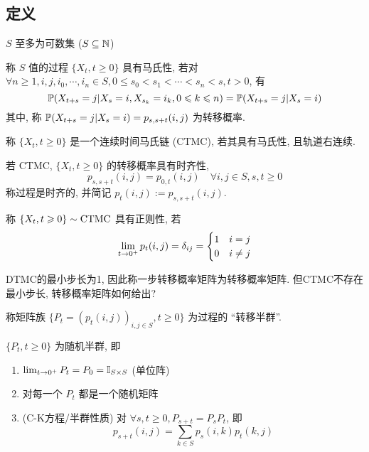 \subsection{定义}

$S$ 至多为可数集 ($S\subseteq \mathbb{N}$)

\begin{definition}[马氏性]
    称 $S$ 值的过程 $\{X_t,t\geq 0\}$ 具有马氏性, 若对 $\forall n\geq 1,i,j,i_0,\cdots,i_n\in S, 0\leq s_0<s_1<\cdots<s_n<s,t>0$, 有
    \begin{equation}
        \mathbb{P}(X_{t+s}=j|X_s=i,X_{s_k}=i_k,0\leqslant k\leqslant n)=\mathbb{P}(X_{t+s}=j|X_s=i)
    \end{equation}
    其中, 称 $\mathbb{P}(X_{t+s}=j|X_s=i)=p_{s,s+t}(i,j)$ 为转移概率.
\end{definition}

\begin{definition}[马氏链]
    称 $\{X_t,t\geq 0\}$ 是一个连续时间马氏链 (CTMC), 若其具有马氏性, 且轨道右连续.
\end{definition}

\begin{definition}[时齐性]
    若 CTMC, $\{X_t,t\geq 0\}$ 的转移概率具有时齐性,
    \[
    p_{s,s+t}(i,j)=p_{0,t}(i,j)\quad \forall i,j\in S, s,t\geq 0
    \]
    称过程是时齐的, 并简记 $p_t(i,j):=p_{s,s+t}(i,j)$.
\end{definition}

\begin{definition}
    称 $\{X_t,t\geqslant 0\}\sim \operatorname{CTMC}$ 具有正则性, 若
    \[
    \lim_{t \to 0^+}p_t(i,j)=\delta_{ij}=\begin{cases}
        1 & i=j\\
        0 & i\neq j
    \end{cases}
    \]
\end{definition}

DTMC的最小步长为1, 因此称一步转移概率矩阵为转移概率矩阵. 但CTMC不存在最小步长, 转移概率矩阵如何给出?

\begin{definition}
    称矩阵族 $\{P_t=(p_t(i,j))_{i,j\in S},t\geq 0\}$ 为过程的 ``转移半群''.
\end{definition}

\begin{theorem}
    $\{P_t,t\geq 0\}$ 为随机半群, 即
    \begin{enumerate}
        \item $\lim_{t \to 0^+}P_t=P_0=\mathbb I_{S\times S}$ (单位阵)
        \item 对每一个 $P_t$ 都是一个随机矩阵
        \item (C-K方程/半群性质) 对 $\forall s,t\geq 0, P_{s+t}=P_s P_t$, 即
        \[
        p_{s+t}(i,j)=\sum_{k\in S}p_s(i,k)p_t(k,j)
        \]
    \end{enumerate}
\end{theorem}

